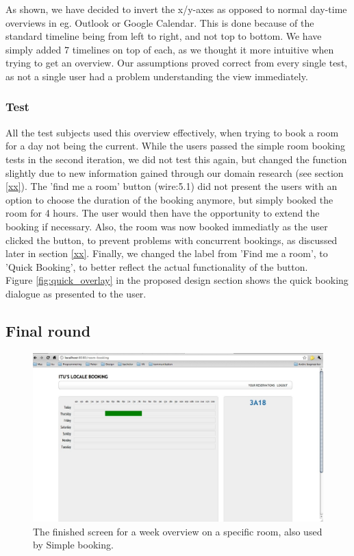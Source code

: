 As shown, we have decided to invert the x/y-axes as opposed to normal day-time overviews in eg. Outlook or Google Calendar. This is done because of the standard timeline being from left to right, and not top to bottom. We have simply added 7 timelines on top of each, as we thought it more intuitive when trying to get an overview. Our assumptions proved correct from every single test, as not a single user had a problem understanding the view immediately.\\

\subsubsection{Test}
All the test subjects used this overview effectively, when trying to book a room for a day not being the current. While the users passed the simple room booking tests in the second iteration, we did not test this again, but changed the function slightly due to new information gained through our domain research (see section \ref{xx}). The 'find me a room' button (wire:5.1) did not present the users with an option to choose the duration of the booking anymore, but simply booked the room for 4 hours. The user would then have the opportunity to extend the booking if necessary. Also, the room was now booked immediatly as the user clicked the button, to prevent problems with concurrent bookings, as discussed later in section \ref{xx}. Finally, we changed the label from 'Find me a room', to 'Quick Booking', to better reflect the actual functionality of the button.\\
Figure \ref{fig:quick_overlay} in the proposed design section shows the quick booking dialogue as presented to the user.


\pagebreak
\subsection{Final round}
\begin{figure}[htb]
\begin{center}
\leavevmode
\includegraphics[width=1\textwidth]{images/weekFinal}
\end{center}
\caption{The finished screen for a week overview on a specific room, also used by Simple booking.}
\label{fig:week_final}
\end{figure}

